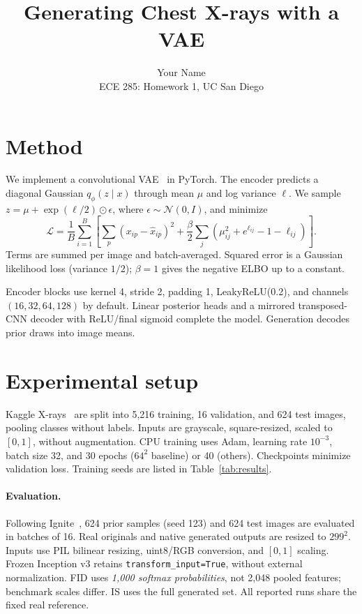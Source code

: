 \documentclass{article}
\title{Generating Chest X-rays with a VAE}
\author{Your Name\\ECE 285: Homework 1, UC San Diego}
\begin{document}
\maketitle

\section{Method}
We implement a convolutional VAE~\cite{vae} in PyTorch. The encoder predicts a diagonal Gaussian
$q_\phi(z\mid x)$ through mean $\mu$ and log variance $\ell$.
We sample $z=\mu+\exp(\ell/2)\odot\epsilon$, where
$\epsilon\sim\mathcal{N}(0,I)$, and minimize
\begin{equation}
\mathcal{L}=\frac1B\sum_{i=1}^B\left[
\sum_p(x_{ip}-\hat{x}_{ip})^2+
\frac\beta2\sum_j(\mu_{ij}^2+e^{\ell_{ij}}-1-\ell_{ij})\right].
\end{equation}
Terms are summed per image and batch-averaged. Squared error is a Gaussian
likelihood loss (variance $1/2$); $\beta=1$ gives the negative ELBO up to a constant.

Encoder blocks use kernel 4, stride 2, padding 1, LeakyReLU(0.2), and channels
$(16,32,64,128)$ by default. Linear posterior heads and a mirrored transposed-CNN
decoder with ReLU/final sigmoid complete the model. Generation decodes prior draws into image means.

\section{Experimental setup}
Kaggle X-rays~\cite{dataset} are split into 5,216 training, 16 validation, and 624
test images, pooling classes without labels. Inputs are grayscale, square-resized,
scaled to $[0,1]$, without augmentation. CPU training uses Adam, learning rate
$10^{-3}$, batch size 32, and 30 epochs ($64^2$ baseline) or 40 (others).
Checkpoints minimize validation loss. Training seeds are listed in Table~\ref{tab:results}.

\paragraph{Evaluation.}
Following Ignite~\cite{ignite}, 624 prior samples (seed 123) and 624 test images
are evaluated in batches of 16. Real originals and native generated outputs
are resized to $299^2$. Inputs use PIL bilinear resizing, uint8/RGB conversion,
and $[0,1]$ scaling. Frozen Inception v3 retains \texttt{transform\_input=True}, without
external normalization. FID uses \emph{1,000 softmax probabilities}, not 2,048
pooled features; benchmark scales differ. IS uses the full generated set.
All reported runs share the fixed real reference.
\end{document}

